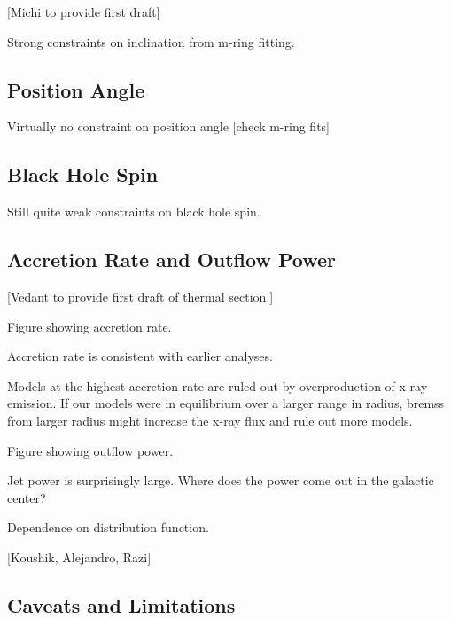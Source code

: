 [Michi to provide first draft]

Strong constraints on inclination from m-ring fitting.

\subsection{Position Angle}

Virtually no constraint on position angle [check m-ring fits]

\subsection{Black Hole Spin}

Still quite weak constraints on black hole spin.

\subsection{Accretion Rate and Outflow Power}

[Vedant to provide first draft of thermal section.]

Figure showing accretion rate.

Accretion rate is consistent with earlier analyses.  

Models at the highest accretion rate are ruled out by overproduction of x-ray emission.  If our models were in equilibrium over a larger range in radius, bremss from larger radius might increase the x-ray flux and rule out more models.

Figure showing outflow power.

Jet power is surprisingly large.  Where does the power come out in the galactic center?

Dependence on distribution function. 

[Koushik, Alejandro, Razi]


\subsection{Caveats and Limitations}

